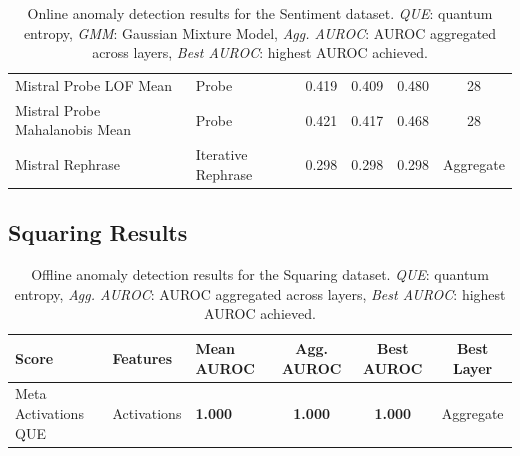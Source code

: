\begin{table}[H]
\begin{tabular}{lp{3cm}lccc}
Mistral Probe LOF Mean               & Probe      & 0.419  & 0.409  & 0.480  & 28 \\ 
Mistral Probe Mahalanobis Mean       & Probe      & 0.421  & 0.417  & 0.468  & 28 \\ 
Mistral Rephrase                     & Iterative Rephrase & 0.298  & 0.298  & 0.298  & Aggregate \\ 
\bottomrule
\end{tabular}
\caption{ Online anomaly detection results for the Sentiment dataset. \emph{QUE}: quantum entropy, \emph{GMM}: Gaussian Mixture Model, \emph{Agg. AUROC}: AUROC aggregated across layers, \emph{Best AUROC}: highest AUROC achieved.}
\label{tab:online_anomaly_sentiment}
\end{table}

\subsection{Squaring Results}

\begin{table}[H]
\centering
\scriptsize  %
\renewcommand{\arraystretch}{1.2}  %
\setlength{\tabcolsep}{2pt}  %
\begin{tabular}{lp{3cm}lccc}
\toprule
\textbf{Score} & \textbf{Features} & \textbf{Mean AUROC} & \textbf{Agg. AUROC} & \textbf{Best AUROC} & \textbf{Best Layer} \\
\midrule
Meta Activations QUE  & Activations & \textbf{1.000}  & \textbf{1.000}  & \textbf{1.000}  & Aggregate \\ 
\bottomrule
\end{tabular}
\caption{ Offline anomaly detection results for the Squaring dataset. \emph{QUE}: quantum entropy, \emph{Agg. AUROC}: AUROC aggregated across layers, \emph{Best AUROC}: highest AUROC achieved.}
\label{tab:offline_anomaly_squaring}
\end{table}

